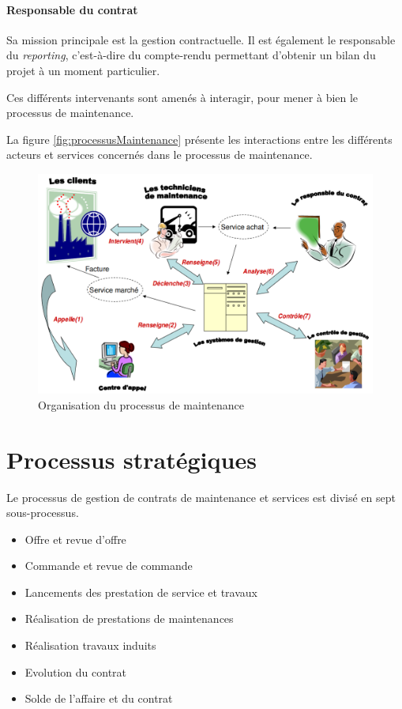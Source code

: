 \paragraph{Responsable du contrat}{Sa mission principale est la gestion contractuelle. Il est également le responsable du \textit{reporting}, c'est-à-dire du compte-rendu permettant d'obtenir un bilan du projet à un moment particulier.}

Ces différents intervenants sont amenés à interagir, pour mener à bien le processus de maintenance.

La figure \vref{fig:processusMaintenance} présente les interactions entre les différents acteurs et services concernés dans le processus de maintenance.

\begin{figure}[h!]
	\centering
	\includegraphics[width=1\linewidth]{images/processusMaintenance.png}
	\caption{Organisation du processus de maintenance}
	\label{fig:processusMaintenance}
\end{figure}

\section{Processus stratégiques}

Le processus de gestion de contrats de maintenance et services est divis\'e en sept sous-processus.

\begin{itemize}
    \item Offre et revue d'offre
    \item Commande et revue de commande
    \item Lancements des prestation de service et travaux
    \item R\'ealisation de prestations de maintenances
    \item R\'ealisation travaux induits
    \item Evolution du contrat
    \item Solde de l'affaire et du contrat
\end{itemize}

